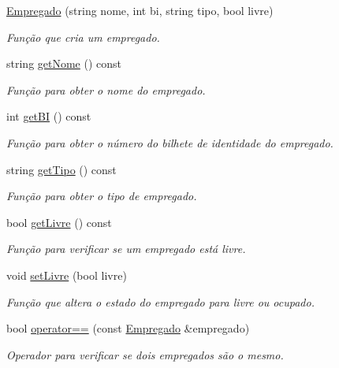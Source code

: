 \begin{DoxyCompactItemize}
\item 
\hyperlink{class_empregado_a41f417a80a0e7e83737c616beede3c7a}{Empregado} (string nome, int bi, string tipo, bool livre)
\begin{DoxyCompactList}\small\item\em Função que cria um empregado. \end{DoxyCompactList}\item 
string \hyperlink{class_empregado_a3b7e1e37085dc3233372303dc5fad063}{get\+Nome} () const 
\begin{DoxyCompactList}\small\item\em Função para obter o nome do empregado. \end{DoxyCompactList}\item 
int \hyperlink{class_empregado_af53f765432478ff43995d6373820a610}{get\+BI} () const 
\begin{DoxyCompactList}\small\item\em Função para obter o número do bilhete de identidade do empregado. \end{DoxyCompactList}\item 
string \hyperlink{class_empregado_a31668a30674046ed45b1543de5948b39}{get\+Tipo} () const 
\begin{DoxyCompactList}\small\item\em Função para obter o tipo de empregado. \end{DoxyCompactList}\item 
bool \hyperlink{class_empregado_a79d9a4467c7c506f26f178fe94f3084d}{get\+Livre} () const 
\begin{DoxyCompactList}\small\item\em Função para verificar se um empregado está livre. \end{DoxyCompactList}\item 
void \hyperlink{class_empregado_a81997099011c547e71bc52c5e69532d9}{set\+Livre} (bool livre)
\begin{DoxyCompactList}\small\item\em Função que altera o estado do empregado para livre ou ocupado. \end{DoxyCompactList}\item 
bool \hyperlink{class_empregado_a853fad9194cfb37648003e7b4acd431c}{operator==} (const \hyperlink{class_empregado}{Empregado} \&empregado)
\begin{DoxyCompactList}\small\item\em Operador para verificar se dois empregados são o mesmo. \end{DoxyCompactList}\end{DoxyCompactItemize}


